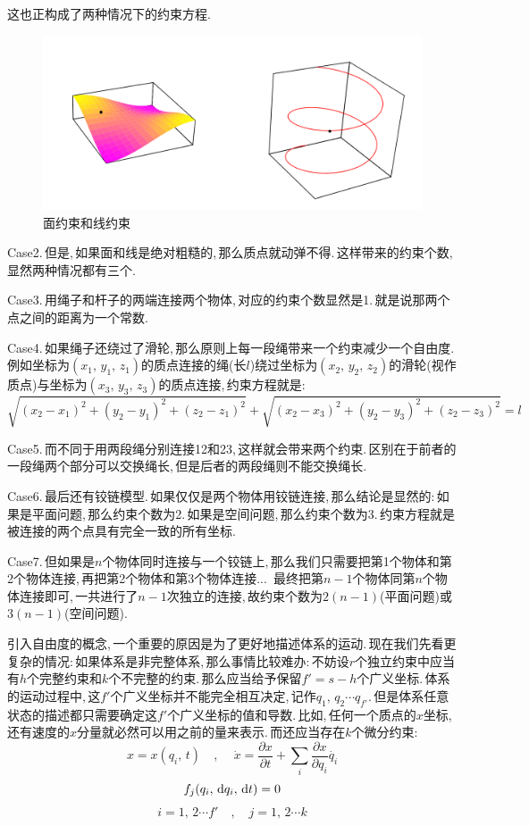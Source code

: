 这也正构成了两种情况下的约束方程.
\begin{figure}[H]
\centering
\includegraphics[width=14cm]{image/6-2-3.png}
\caption{面约束和线约束}
\end{figure}

Case2.\,但是,\,如果面和线是绝对粗糙的,\,那么质点就动弹不得.\,这样带来的约束个数,\,显然两种情况都有三个.

Case3.\,用绳子和杆子的两端连接两个物体,\,对应的约束个数显然是1.\,就是说那两个点之间的距离为一个常数.

Case4.\,如果绳子还绕过了滑轮,\,那么原则上每一段绳带来一个约束减少一个自由度.\,例如坐标为$(x_1,\,y_1,\,z_1)$的质点连接的绳(长$l$)绕过坐标为$(x_2,\,y_2,\,z_2)$的滑轮(视作质点)与坐标为$(x_3,\,y_3,\,z_3)$的质点连接,\,约束方程就是:
\[\sqrt{(x_2-x_1)^2+(y_2-y_1)^2+(z_2-z_1)^2}+\sqrt{(x_2-x_3)^2+(y_2-y_3)^2+(z_2-z_3)^2}=l\]

Case5.\,而不同于用两段绳分别连接12和23,\,这样就会带来两个约束.\,区别在于前者的一段绳两个部分可以交换绳长,\,但是后者的两段绳则不能交换绳长.

Case6.\,最后还有铰链模型.\,如果仅仅是两个物体用铰链连接,\,那么结论是显然的:\,如果是平面问题,\,那么约束个数为2.\,如果是空间问题,\,那么约束个数为3.\,约束方程就是被连接的两个点具有完全一致的所有坐标.

Case7.\,但如果是$n$个物体同时连接与一个铰链上,\,那么我们只需要把第1个物体和第2个物体连接,\,再把第2个物体和第3个物体连接...\, 最终把第$n-1$个物体同第$n$个物体连接即可,\,一共进行了$n-1$次独立的连接,\,故约束个数为$2(n-1)$(平面问题)或$3(n-1)$(空间问题).
\vspace{1cm}

引入自由度的概念,\,一个重要的原因是为了更好地描述体系的运动.\,现在我们先看更复杂的情况:\,如果体系是非完整体系,\,那么事情比较难办:\,不妨设$r$个独立约束中应当有$h$个完整约束和$k$个不完整的约束.\,那么应当给予保留$f'=s-h$个广义坐标.\,体系的运动过程中,\,这$f'$个广义坐标并不能完全相互决定,\,记作$q_1,\,q_2\cdots q_{f'}$.\,但是体系任意状态的描述都只需要确定这$f'$个广义坐标的值和导数.\,比如,\,任何一个质点的$x$坐标,\,还有速度的$x$分量就必然可以用之前的量来表示.\,而还应当存在$k$个微分约束:
\[x=x(q_i,\,t)\quad,\,\quad \dot{x}=\frac{\partial x}{\partial t}+\sum_i \frac{\partial x}{\partial q_i}\dot{q_i}\]
\[f_j(q_i,\,\textrm{d} q_i,\,\textrm{d} t)=0\]
\[i=1,\,2\cdots f' \quad,\quad j=1,\,2\cdots k\]

